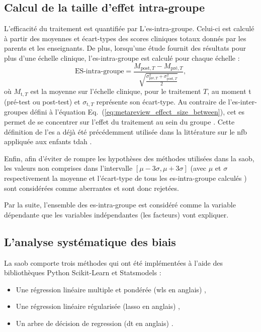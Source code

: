 \subsection{Calcul de la taille d'effet intra-groupe}

L'efficacité du traitement est quantifiée par L'\gls{es}-intra-groupe. Celui-ci est calculé à partir des moyennes et écart-types des scores 
cliniques totaux donnés par les parents et les enseignants. De plus, lorsqu'une étude 
fournit des résultats pour plus d'une échelle clinique, l'\gls{es}-intra-groupe est calculé pour chaque échelle :
\begin{equation}
\label{eq:factors_effect_size_within_subject}
\text{ES-intra-groupe} = \frac{M_{\text{post},T} - M_{\text{pré},T}}{\sqrt{\frac{\sigma_{\text{pré},T}^2 + \sigma_{\text{post},T}^2}{2}}},
\end{equation} 
\noindent où $M_{\text{t},T}$ est la moyenne sur l'échelle clinique, pour le traitement $T$, au moment t (pré-test ou post-test) et $\sigma_{\text{t},T}$ représente
son écart-type. Au contraire de l'\gls{es}-inter-groupes défini à l'équation Eq.~(\ref{eq:metareview_effect_size_between}), cet \gls{es} permet de se concentrer sur l'effet du 
traitement au sein du groupe \citep{Cohen1988}. Cette définition de l'\gls{es} a déjà été précédemment utilisée dans la littérature sur le \gls{nfb} 
appliquée aux enfants \gls{tdah} \citep{Arns2009, Maurizio2014, Strehl2017}. 

Enfin, afin d'éviter de rompre les hypothèses des méthodes utilisées dans la \gls{saob}, les valeurs non comprises dans l'intervalle 
$[\mu - 3 \sigma, \mu + 3 \sigma]$ (avec $\mu$ et $\sigma$ respectivement la moyenne et l'écart-type de tous les \gls{es}-intra-groupe calculés \citep{Shewhart1931})
sont considérées comme aberrantes et sont donc rejetées.

Par la suite, l'ensemble des \gls{es}-intra-groupe est considéré comme la variable dépendante que les variables indépendantes (les facteurs) vont expliquer. 

\subsection{L'analyse systématique des biais}

La \gls{saob} comporte trois méthodes qui ont été implémentées à l'aide des bibliothèques Python Scikit-Learn \citep[version 0.18.1]{Pedregosa2011} et Statsmodels \citep[version 0.8.0]{Seabold2010} : 
\begin{itemize}
  \item Une régression linéaire multiple et pondérée (\gls{wls} en anglais) \citep{Montgomery2012},
	\item Une régression linéaire régularisée (\gls{lasso} en anglais) \citep{Tibshirani1996},
	\item Un arbre de décision de regression (\gls{dt} en anglais) \citep{Quinlan1986}.
\end{itemize}

